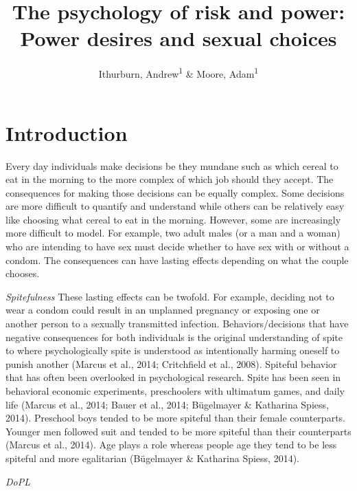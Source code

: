 \documentclass[
  english,
  a4paper]{apa7}
\title{The psychology of risk and power: Power desires and sexual choices}
\author{Ithurburn, Andrew\textsuperscript{1} \& Moore, Adam\textsuperscript{1}}
\date{}
\affiliation{\vspace{0.5cm}\textsuperscript{1} The University of Edinburgh}
\begin{document}
\maketitle

\hypertarget{introduction}{%
\section{Introduction}\label{introduction}}

Every day individuals make decisions be they mundane such as which cereal to eat in the morning to the more complex of which job should they accept. The consequences for making those decisions can be equally complex. Some decisions are more difficult to quantify and understand while others can be relatively easy like choosing what cereal to eat in the morning. However, some are increasingly more difficult to model. For example, two adult males (or a man and a woman) who are intending to have sex must decide whether to have sex with or without a condom. The consequences can have lasting effects depending on what the couple chooses.

\emph{Spitefulness}
These lasting effects can be twofold. For example, deciding not to wear a condom could result in an unplanned pregnancy or exposing one or another person to a sexually transmitted infection. Behaviors/decisions that have negative consequences for both individuals is the original understanding of spite to where psychologically spite is understood as intentionally harming oneself to punish another (Marcus et al., 2014; Critchfield et al., 2008). Spiteful behavior that has often been overlooked in psychological research. Spite has been seen in behavioral economic experiments, preschoolers with ultimatum games, and daily life (Marcus et al., 2014; Bauer et al., 2014; Bügelmayer \& Katharina Spiess, 2014). Preschool boys tended to be more spiteful than their female counterparts. Younger men followed suit and tended to be more spiteful than their counterparts (Marcus et al., 2014). Age plays a role whereas people age they tend to be less spiteful and more egalitarian (Bügelmayer \& Katharina Spiess, 2014).

\emph{DoPL}
\end{document}
